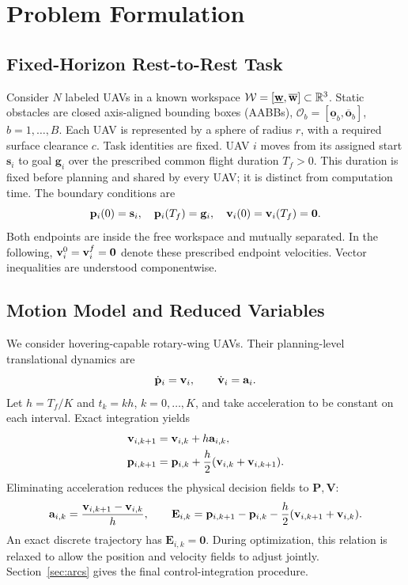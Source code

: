 \section{Problem Formulation}
\label{sec:formulation}
\subsection{Fixed-Horizon Rest-to-Rest Task}
Consider $N$ labeled UAVs in a known workspace $\mathcal W=[\underline{\mathbf w},\overline{\mathbf w}]\subset\mathbb{R}^3$. Static obstacles are closed axis-aligned bounding boxes (AABBs), $\mathcal O_b=[\underline{\mathbf o}_b,\overline{\mathbf o}_b]$, $b=1,\ldots,B$. Each UAV is represented by a sphere of radius $r$, with a required surface clearance $c$. Task identities are fixed. UAV $i$ moves from its assigned start $\mathbf s_i$ to goal $\mathbf g_i$ over the prescribed common flight duration $T_f>0$. This duration is fixed before planning and shared by every UAV; it is distinct from computation time. The boundary conditions are
\begin{equation}
 \mathbf{p}_i(0)=\mathbf s_i,\quad \mathbf{p}_i(T_f)=\mathbf g_i,\quad
 \mathbf{v}_i(0)=\mathbf{v}_i(T_f)=\mathbf0 .
 \label{eq:endpoint}
\end{equation}
Both endpoints are inside the free workspace and mutually separated. In the following, $\mathbf{v}_i^0=\mathbf{v}_i^f=\mathbf0$ denote these prescribed endpoint velocities. Vector inequalities are understood componentwise.

\subsection{Motion Model and Reduced Variables}
We consider hovering-capable rotary-wing UAVs. Their planning-level translational dynamics are
\begin{equation}
 \dot{\mathbf{p}}_i=\mathbf{v}_i,\qquad \dot{\mathbf{v}}_i=\mathbf{a}_i.
 \label{eq:continuous}
\end{equation}
Let $h=T_f/K$ and $t_k=kh$, $k=0,\ldots,K$, and take acceleration to be constant on each interval. Exact integration yields
\begin{subequations}\label{eq:discrete}\begin{align}
 \mathbf{v}_{i,k+1}&=\mathbf{v}_{i,k}+h\mathbf{a}_{i,k},\label{eq:velocityupdate}\\
 \mathbf{p}_{i,k+1}&=\mathbf{p}_{i,k}+\frac h2(\mathbf{v}_{i,k}+\mathbf{v}_{i,k+1}).\label{eq:positionupdate}
\end{align}\end{subequations}
Eliminating acceleration reduces the physical decision fields to $\mathbf P,\mathbf V$:
\begin{equation}
 \mathbf{a}_{i,k}=\frac{\mathbf{v}_{i,k+1}-\mathbf{v}_{i,k}}h,\qquad
 \mathbf E_{i,k}=\mathbf{p}_{i,k+1}-\mathbf{p}_{i,k}
 -\frac h2(\mathbf{v}_{i,k+1}+\mathbf{v}_{i,k}).
 \label{eq:defect}
\end{equation}
An exact discrete trajectory has $\mathbf E_{i,k}=\mathbf0$. During optimization, this relation is relaxed to allow the position and velocity fields to adjust jointly. Section~\ref{sec:arcs} gives the final control-integration procedure.

